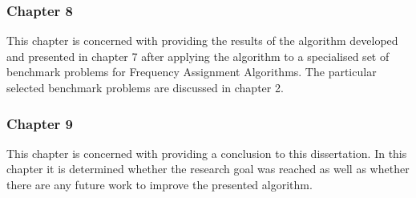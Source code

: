 \subsubsection{Chapter 8}
This chapter is concerned with providing the results of the algorithm developed and presented in chapter 7 after applying the algorithm to a specialised set of benchmark problems for Frequency Assignment Algorithms. The particular selected benchmark problems are discussed in chapter 2.
\subsubsection{Chapter 9}
This chapter is concerned with providing a conclusion to this dissertation. In this chapter it is determined whether the research goal was reached as well as whether there are any future work to improve the presented algorithm.
